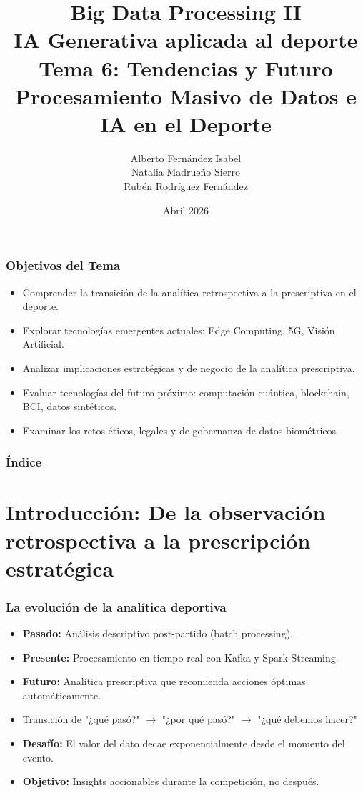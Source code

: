 \documentclass[aspectratio=169]{beamer}
\institute[URJC]{DSLAB}
\author[Big Data Processing II]{
	Alberto Fernández Isabel \\
	Natalia Madrueño Sierro \\
	Rubén Rodríguez Fernández \\
}
\title[Presentación]{
	Big Data Processing II \\ \vspace{0.2em}
	IA Generativa aplicada al deporte \\ \vspace{0.2em}
    Tema 6: Tendencias y Futuro \\ \vspace{0.2em}
    Procesamiento Masivo de Datos e IA en el Deporte
}
\date{Abril 2026}
\begin{document}
\begin{frame}
\titlepage
\end{frame}

\begin{frame}\frametitle{Objetivos del Tema}
\begin{itemize}
    \item Comprender la transición de la analítica retrospectiva a la prescriptiva en el deporte.
    \item Explorar tecnologías emergentes actuales: Edge Computing, 5G, Visión Artificial.
    \item Analizar implicaciones estratégicas y de negocio de la analítica prescriptiva.
    \item Evaluar tecnologías del futuro próximo: computación cuántica, blockchain, BCI, datos sintéticos.
    \item Examinar los retos éticos, legales y de gobernanza de datos biométricos.
\end{itemize}
\end{frame}

\begin{frame}\frametitle{Índice}
\tableofcontents
\end{frame}

\section{Introducción: De la observación retrospectiva a la prescripción estratégica}
\frame{\sectionpage}

\begin{frame}\frametitle{La evolución de la analítica deportiva}
\begin{itemize}
    \item \textbf{Pasado:} Análisis descriptivo post-partido (batch processing).
    \item \textbf{Presente:} Procesamiento en tiempo real con Kafka y Spark Streaming.
    \item \textbf{Futuro:} Analítica prescriptiva que recomienda acciones óptimas automáticamente.
    \item Transición de "¿qué pasó?" $\rightarrow$ "¿por qué pasó?" $\rightarrow$ "¿qué debemos hacer?"
\end{itemize}
\vspace{0.1em}
\begin{itemize}
    \item \textbf{Desafío:} El valor del dato decae exponencialmente desde el momento del evento.
    \item \textbf{Objetivo:} Insights accionables durante la competición, no después.
\end{itemize}
\end{frame}
\end{document}
